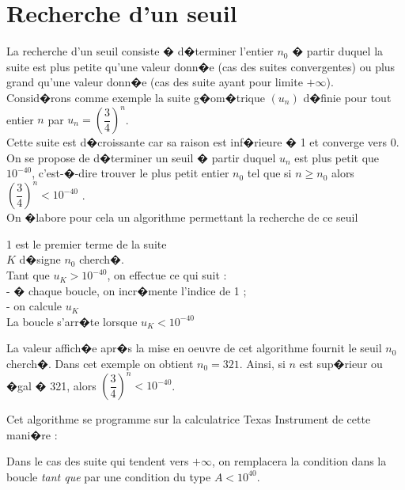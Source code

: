 \documentclass[a4paper,12pt,twoside,french]{extarticle}
\begin{document}
\section{Recherche d'un seuil}

\noindent La recherche d'un seuil consiste � d�terminer l'entier $n_0$ � partir duquel la suite est plus petite qu'une valeur donn�e (cas des suites convergentes) ou plus grand qu'une valeur donn�e (cas des suite ayant pour limite $+\infty$).\\

\noindent Consid�rons comme exemple la suite g�om�trique $(u_n)$ d�finie pour tout entier $n$ par $u_n=\left(\dfrac{3}{4}\right)^n$.\\
Cette suite est d�croissante car sa raison est inf�rieure � 1 et converge vers 0.\\

\noindent On se propose de d�terminer un seuil � partir duquel $u_n$ est plus petit que $10^{-40}$, c'est-�-dire trouver le plus petit entier $n_0$ tel que si $n \geqslant n_0$  alors $\left(\dfrac{3}{4}\right)^n<10^{-40}$ .\\

\noindent On �labore pour cela un algorithme permettant la recherche de ce seuil 
\begin{multicols}{2}
\medskip


\columnbreak


\noindent \vphantom{\LARGE A}1 est le premier terme de la suite\\
$K$ d�signe $n_0$ cherch�.\\
Tant que $u_K > 10^{-40}$, on effectue ce qui suit :\\
- � chaque boucle, on incr�mente l'indice de 1 ;\\
- on calcule $u_K$ \\
La boucle s'arr�te lorsque $u_K<10^{-40}$
\end{multicols}
\noindent La valeur affich�e apr�s la mise en oeuvre de cet algorithme fournit le seuil $n_0$ cherch�. Dans cet exemple on obtient $n_0=321$. Ainsi, si $n$ est sup�rieur ou �gal � 321, alors $\left(\dfrac{3}{4}\right)^n < 10^{-40}$.

\noindent Cet algorithme se programme sur la calculatrice Texas Instrument de cette mani�re :


\noindent Dans le cas des suite qui tendent vers $+\infty$, on remplacera la condition dans la boucle \emph{tant que} par une condition du type $A<10^{40}$.\\ 
\end{document}
